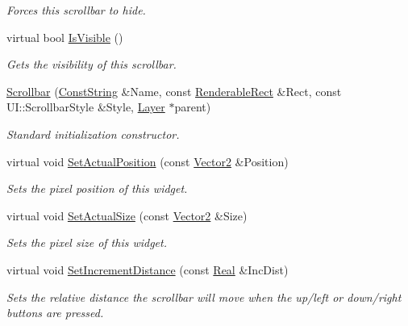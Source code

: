 \begin{DoxyCompactItemize}
\begin{DoxyCompactList}\small\item\em Forces this scrollbar to hide. \item\end{DoxyCompactList}\item 
virtual bool \hyperlink{classphys_1_1UI_1_1Scrollbar_a213c946ccadd3b689f59e2761a1d1848}{IsVisible} ()
\begin{DoxyCompactList}\small\item\em Gets the visibility of this scrollbar. \item\end{DoxyCompactList}\item 
\hyperlink{classphys_1_1UI_1_1Scrollbar_afa32dd9599bd7a2150faa950b72f16e1}{Scrollbar} (\hyperlink{namespacephys_a5ce5049f8b4bf88d6413c47b504ebb31}{ConstString} \&Name, const \hyperlink{structphys_1_1UI_1_1RenderableRect}{RenderableRect} \&Rect, const UI::ScrollbarStyle \&Style, \hyperlink{classphys_1_1UI_1_1Layer}{Layer} $\ast$parent)
\begin{DoxyCompactList}\small\item\em Standard initialization constructor. \item\end{DoxyCompactList}\item 
virtual void \hyperlink{classphys_1_1UI_1_1Scrollbar_a93dfa3232185d72f274462636a833465}{SetActualPosition} (const \hyperlink{classphys_1_1Vector2}{Vector2} \&Position)
\begin{DoxyCompactList}\small\item\em Sets the pixel position of this widget. \item\end{DoxyCompactList}\item 
virtual void \hyperlink{classphys_1_1UI_1_1Scrollbar_aabdb8b727f1f84712a5f7c1fca6e830f}{SetActualSize} (const \hyperlink{classphys_1_1Vector2}{Vector2} \&Size)
\begin{DoxyCompactList}\small\item\em Sets the pixel size of this widget. \item\end{DoxyCompactList}\item 
virtual void \hyperlink{classphys_1_1UI_1_1Scrollbar_a238097181d00ac3bbff0d31d2dc0b237}{SetIncrementDistance} (const \hyperlink{namespacephys_af7eb897198d265b8e868f45240230d5f}{Real} \&IncDist)
\begin{DoxyCompactList}\small\item\em Sets the relative distance the scrollbar will move when the up/left or down/right buttons are pressed. \item\end{DoxyCompactList}\item 

\end{DoxyCompactItemize}
